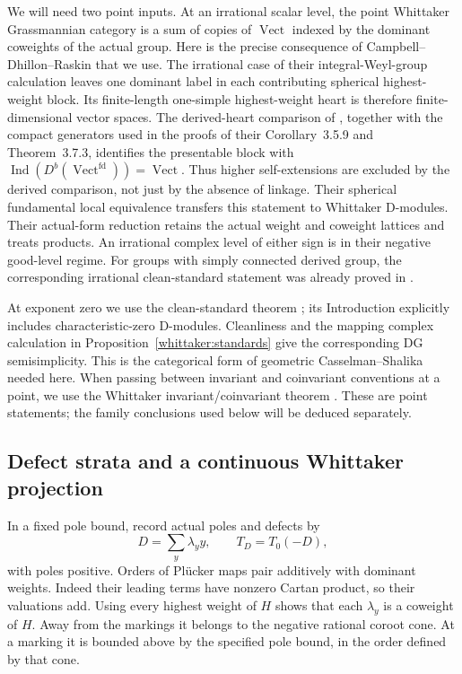 \documentclass[11pt]{article}
\numberwithin{equation}{section}
\theoremstyle{definition}
\theoremstyle{remark}
\begin{document}
We will need two point inputs. At an irrational scalar level, the point
Whittaker Grassmannian category is a sum of copies of
$\operatorname{Vect}$ indexed by the dominant coweights of the actual
group. Here is the precise consequence of Campbell--Dhillon--Raskin that
we use. The irrational case of their integral-Weyl-group calculation
\cite[Theorem~3.5.6, Equation~(3.28)]{CDR} leaves one dominant label in
each contributing spherical highest-weight block. Its finite-length
one-simple highest-weight heart is therefore finite-dimensional vector spaces.
The derived-heart comparison of \cite[Section~2.9.4]{CDR}, together with
the compact generators used in the proofs of their Corollary~3.5.9 and
Theorem~3.7.3, identifies the presentable block with
$\operatorname{Ind}(D^b(\operatorname{Vect}^{\mathrm{fd}}))=
\operatorname{Vect}$. Thus higher self-extensions are excluded by the
derived comparison, not just by the absence of linkage. Their spherical
fundamental local equivalence \cite[Remark~3.7.5]{CDR} transfers this
statement to Whittaker D-modules. Their actual-form reduction
\cite[Section~4.2, Proposition~4.2.2, and Section~4.3]{CDR} retains the
actual weight and coweight lattices and treats products. An irrational
complex level of either sign is in their negative good-level regime.
For groups with simply connected derived group, the corresponding
irrational clean-standard statement was already proved in
\cite[Proposition~8.4]{GaitsgoryTwisted}.

At exponent zero we use the clean-standard theorem
\cite[Theorem~3]{FrenkelGaitsgoryVilonen}; its Introduction explicitly
includes characteristic-zero D-modules. Cleanliness and the mapping
complex calculation in Proposition~\ref{whittaker:standards} give the
corresponding DG semisimplicity. This is the categorical form of geometric
Casselman--Shalika needed here. When passing between invariant and
coinvariant conventions at a point, we use the Whittaker
invariant/coinvariant theorem \cite[Theorem~2.1.1]{RaskinW}. These are point
statements; the family conclusions used below will be deduced separately.

\subsection{Defect strata and a continuous Whittaker projection}

In a fixed pole bound, record actual poles and defects by
\[
 D=\sum_y\lambda_y y,\qquad T_D=T_0(-D),
\]
with poles positive. Orders of Pl\"ucker maps pair additively with dominant
weights. Indeed their leading terms have nonzero Cartan product, so their
valuations add. Using every highest weight of $H$ shows that each
$\lambda_y$ is a coweight of $H$. Away from the markings it belongs to the
negative rational coroot cone. At a marking it is bounded above by the
specified pole bound, in the order defined by that cone.
\end{document}
